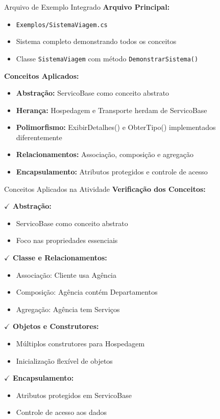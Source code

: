 \documentclass[aspectratio=169]{beamer}
\begin{document}
\begin{frame}{Arquivo de Exemplo Integrado}
\textbf{Arquivo Principal:}
\begin{itemize}
    \item \texttt{Exemplos/SistemaViagem.cs}
    \item Sistema completo demonstrando todos os conceitos
    \item Classe \texttt{SistemaViagem} com método \texttt{DemonstrarSistema()}
\end{itemize}

\textbf{Conceitos Aplicados:}
\begin{itemize}
    \item \textbf{Abstração:} ServicoBase como conceito abstrato
    \item \textbf{Herança:} Hospedagem e Transporte herdam de ServicoBase
    \item \textbf{Polimorfismo:} ExibirDetalhes() e ObterTipo() implementados diferentemente
    \item \textbf{Relacionamentos:} Associação, composição e agregação
    \item \textbf{Encapsulamento:} Atributos protegidos e controle de acesso
\end{itemize}
\end{frame}

\begin{frame}{Conceitos Aplicados na Atividade}
\textbf{Verificação dos Conceitos:}

\textbf{$\checkmark$ Abstração:}
\begin{itemize}
    \item ServicoBase como conceito abstrato
    \item Foco nas propriedades essenciais
\end{itemize}

\textbf{$\checkmark$ Classe e Relacionamentos:}
\begin{itemize}
    \item Associação: Cliente usa Agência
    \item Composição: Agência contém Departamentos
    \item Agregação: Agência tem Serviços
\end{itemize}

\textbf{$\checkmark$ Objetos e Construtores:}
\begin{itemize}
    \item Múltiplos construtores para Hospedagem
    \item Inicialização flexível de objetos
\end{itemize}

\textbf{$\checkmark$ Encapsulamento:}
\begin{itemize}
    \item Atributos protegidos em ServicoBase
    \item Controle de acesso aos dados
\end{itemize}
\end{frame}
\end{document}
